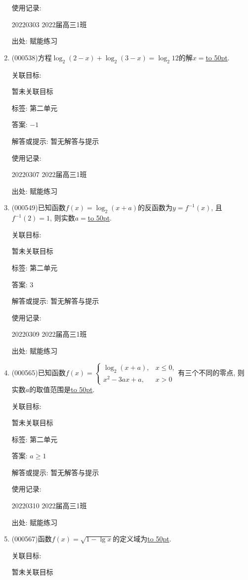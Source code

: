 \documentclass[10pt,a4paper]{article}
\newcommand{\blank}[1]{\underline{\hbox to #1pt{}}}
\begin{document}
\begin{enumerate}[1.]
使用记录:

20220303	2022届高三1班	


出处: 赋能练习
\item { (000538)}方程$\log_2(2-x)+\log_2(3-x)=\log_2 12$的解$x=$\blank{50}.


关联目标:

暂未关联目标



标签: 第二单元

答案: $-1$

解答或提示: 暂无解答与提示

使用记录:

20220307	2022届高三1班	


出处: 赋能练习
\item { (000549)}已知函数$f(x)=\log_2(x+a)$的反函数为$y=f^{-1}(x)$, 且$f^{-1}(2)=1$, 则实数$a=$\blank{50}.


关联目标:

暂未关联目标



标签: 第二单元

答案: $3$

解答或提示: 暂无解答与提示

使用记录:

20220309	2022届高三1班	


出处: 赋能练习
\item { (000565)}已知函数$f(x)=\begin{cases} \log_2 (x+a), & x\le 0, \\ x^2-3ax+a, & x>0 \end{cases}$有三个不同的零点, 则实数$a$的取值范围是\blank{50}.


关联目标:

暂未关联目标



标签: 第二单元

答案: $a\ge 1$

解答或提示: 暂无解答与提示

使用记录:

20220310	2022届高三1班	


出处: 赋能练习
\item { (000567)}函数$f(x)=\sqrt{1-\lg x}$的定义域为\blank{50}.


关联目标:

暂未关联目标




\end{enumerate}
\end{document}
